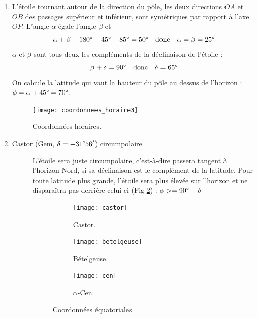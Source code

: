 \documentclass[a4paper,10pt]{report}
\renewcommand{\deg}{\ensuremath{\degree}}
\begin{document}
\begin{Answer}
  \begin{enumerate}
  \item L'étoile tournant autour de la direction du pôle, les deux
    directions $OA$ et $OB$ des passages supérieur et inférieur, sont
    symétriques par rapport à l'axe $OP$. L'angle $\alpha$ égale
    l'angle $\beta$ et
    $$
    \alpha + \beta+180\deg - 45\deg -85\deg = 50\deg
    \quad\text{donc}\quad
    \alpha=\beta=25\deg
    $$
    $\alpha$ et $\beta$ sont tous deux les compléments de la
    déclinaison de l'étoile :
    $$
    \beta+\delta = 90\deg
    \quad\text{donc}\quad
    \delta=65\deg
    $$
    On calcule la latitude qui vaut la hauteur du pôle au dessus de
    l'horizon : $\phi=\alpha+45\deg=70\deg$.

    \begin{figure}%
      \centering
      \texttt{[image: coordonnees\_horaire3]}
      \caption{Coordonnées horaires.}
      \label{coordonneeshoraire3}
    \end{figure}

  \item
    \begin{description}
    \item[Castor (Gem, $\delta = +31\deg56'$) circumpolaire]
      L'étoile sera juste circumpolaire, c'est-à-dire passera tangent
      à l'horizon Nord, si sa déclinaison est le complément de la
      latitude.  Pour toute latitude plus grande, l'étoile sera plus
      élevée sur l'horizon et ne disparaîtra pas derrière celui-ci
      (Fig \ref{castor}) : $\phi>=90\deg-\delta$
      \begin{figure}[htp]
        \centering
        \begin{subfigure}[b]{0.3\textwidth}
          \centering
          \texttt{[image: castor]}
          \caption{Castor.}
        \label{castor}
        \end{subfigure}
        \begin{subfigure}[b]{0.3\textwidth}
          \centering
          \texttt{[image: betelgeuse]}
          \caption{Bételgeuse.}
          \label{betelgeuse}
        \end{subfigure}
        \begin{subfigure}[b]{0.3\textwidth}
          \centering
          \texttt{[image: cen]}
          \caption{$\alpha$-Cen.}
          \label{cen}
        \end{subfigure}
        \caption{Coordonnées équatoriales.}
      \end{figure}


\end{description}
\end{enumerate}
\end{Answer}
\end{document}
